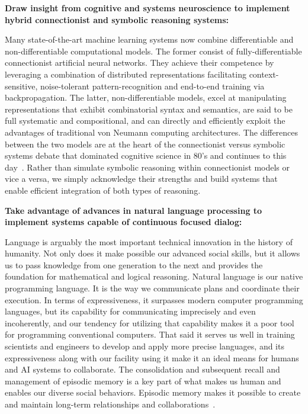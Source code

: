 \documentclass[letterpaper,12pt]{article}
\begin{document}
{\bf{Draw insight from cognitive and systems neuroscience to implement hybrid connectionist and symbolic reasoning systems:}}

Many state-of-the-art machine learning systems now combine differentiable and non-differentiable computational models. The former consist of fully-differentiable connectionist artificial neural networks. They achieve their competence by leveraging a combination of distributed representations facilitating context-sensitive, noise-tolerant pattern-recognition and end-to-end training via backpropagation. The latter, non-differentiable models, excel at manipulating representations that exhibit combinatorial syntax and semantics, are said to be full systematic and compositional, and can directly and efficiently exploit the advantages of traditional von Neumann computing architectures. The differences between the two models are at the heart of the connectionist versus symbolic systems debate that dominated cognitive science in 80's and continues to this day~\cite{OReillyetalTACO-14,FodorandPylyshynCOGNITION-88}. Rather than simulate symbolic reasoning within connectionist models or vice a versa, we simply acknowledge their strengths and build systems that enable efficient integration of both types of reasoning.


{\bf{Take advantage of advances in natural language processing to implement systems capable of continuous focused dialog:}}

Language is arguably the most important technical innovation in the history of humanity. Not only does it make possible our advanced social skills, but it allows us to pass knowledge from one generation to the next and provides the foundation for mathematical and logical reasoning. Natural language is our native programming language. It is the way we communicate plans and coordinate their execution. In terms of expressiveness, it surpasses modern computer programming languages, but its capability for communicating imprecisely and even incoherently, and our tendency for utilizing that capability makes it a poor tool for programming conventional computers. That said it serves us well in training scientists and engineers to develop and apply more precise languages, and its expressiveness along with our facility using it make it an ideal means for humans and AI systems to collaborate. The consolidation and subsequent recall and management of episodic memory is a key part of what makes us human and enables our diverse social behaviors. Episodic memory makes it possible to create and maintain long-term relationships and collaborations~\cite{PritzeletalICML-17,MoscovitchetalARP-16,OReillyetalCS-15}.
\end{document}
